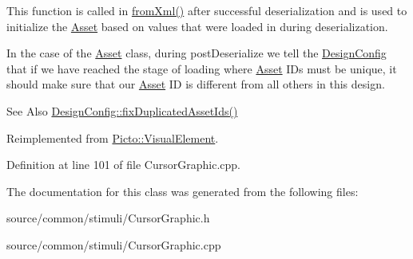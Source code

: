 This function is called in \hyperlink{class_picto_1_1_asset_a8bed4da09ecb1c07ce0dab313a9aba67}{from\-Xml()} after successful deserialization and is used to initialize the \hyperlink{class_picto_1_1_asset}{Asset} based on values that were loaded in during deserialization. 

In the case of the \hyperlink{class_picto_1_1_asset}{Asset} class, during post\-Deserialize we tell the \hyperlink{class_picto_1_1_design_config}{Design\-Config} that if we have reached the stage of loading where \hyperlink{class_picto_1_1_asset}{Asset} I\-Ds must be unique, it should make sure that our \hyperlink{class_picto_1_1_asset}{Asset} I\-D is different from all others in this design. \begin{DoxySeeAlso}{See Also}
\hyperlink{class_picto_1_1_design_config_ab57e0738b97e4358ab09530cd6815fc0}{Design\-Config\-::fix\-Duplicated\-Asset\-Ids()} 
\end{DoxySeeAlso}


Reimplemented from \hyperlink{struct_picto_1_1_visual_element_a48c6087344d566cae7cd925443b571da}{Picto\-::\-Visual\-Element}.



Definition at line 101 of file Cursor\-Graphic.\-cpp.



The documentation for this class was generated from the following files\-:\begin{DoxyCompactItemize}
\item 
source/common/stimuli/Cursor\-Graphic.\-h\item 
source/common/stimuli/Cursor\-Graphic.\-cpp\end{DoxyCompactItemize}
